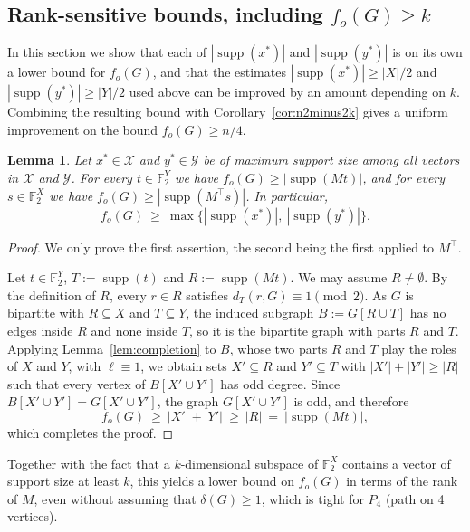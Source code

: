 \documentclass[11pt]{article}
\newcommand{\VV}[1]{{#1}}
\newtheorem{lemma}[theorem]{Lemma}
\theoremstyle{definition}
\theoremstyle{remark}
\newcommand{\supp}{\operatorname{supp}}
\newcommand{\fo}{f_o}
\newcommand{\1}{\mathbf{1}}
\begin{document}
	\subsection{\texorpdfstring{\VV{Rank-sensitive bounds, including $f_o(G)\geq k$}}{Rank-sensitive bounds, including fo(G) >= k}}
	
	In this section we show that each of $|\supp(x^{*})|$ and $|\supp(y^{*})|$ is on its own a lower bound for $\fo(G)$, and that the estimates $|\supp(x^{*})|\ge|X|/2$ and $|\supp(y^{*})|\ge|Y|/2$ used above can be improved by an amount depending on $k$. Combining the resulting bound with Corollary~\ref{cor:n2minus2k} gives a uniform improvement on the bound $\fo(G)\ge n/4$. 
	\begin{lemma}\label{lem:onesided}
		Let $x^{*}\in\mathcal{X}$ and $y^{*}\in\mathcal{Y}$ be of maximum support size among all vectors in $\mathcal{X}$ and $\mathcal{Y}$. For every $t\in\mathbb{F}_2^{Y}$ we have $\fo(G)\ge|\supp(Mt)|$, and for every $s\in\mathbb{F}_2^{X}$ we have $\fo(G)\ge|\supp(M^{\top}s)|$. In particular,
		\[
		\fo(G)\ \ge\ \max\bigl\{|\supp(x^{*})|,\ |\supp(y^{*})|\bigr\}.
		\]
	\end{lemma}
	
	\begin{proof}
		We only prove the first assertion, the second being the first applied to $M^{\top}$.
		
		Let $t\in\mathbb{F}_2^{Y}$, $T:=\supp(t)$ and $R:=\supp(Mt)$. We may assume $R\neq\emptyset$.
		By the definition of $R$, every $r\in R$ satisfies $d_T(r,G)\equiv 1\pmod 2$.  As $G$ is
		bipartite with $R\subseteq X$ and $T\subseteq Y$, the induced subgraph $B:=G[R\cup T]$ has no
		edges inside $R$ and none inside $T$, so it is the bipartite graph with parts $R$ and $T$.
		Applying Lemma~\ref{lem:completion} to $B$, whose two parts $R$ and $T$ play the roles of $X$
		and $Y$, with $\ell\equiv 1$, we obtain sets $X'\subseteq R$ and $Y'\subseteq T$ with
		$|X'|+|Y'|\ge |R|$ such that every vertex of $B[X'\cup Y']$ has odd degree.  Since
		$B[X'\cup Y']=G[X'\cup Y']$, the graph $G[X'\cup Y']$ is odd, and therefore
		\[
		\fo(G)\ \ge\ |X'|+|Y'|\ \ge\ |R|\ =\ |\supp(Mt)| ,
		\]
		which completes the proof.
	\end{proof}
	
	Together with the fact that a $k$-dimensional subspace of $\mathbb{F}_2^{X}$ contains a vector of support size at least $k$, this yields a lower bound on $f_o(G)$ in terms of the rank of $M$, even without assuming that $\delta(G)\geq 1$, which is tight for $P_4$ (path on 4 vertices). 
	
\end{document}

